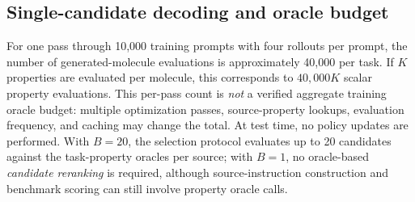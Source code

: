 \begin{table}[t]
\centering\small
\caption{LogSumExp temperature sensitivity on Mistral GDPO, from the author rebuttal.}
\label{tab:tau_sensitivity}
\end{table}

\subsection{Single-candidate decoding and oracle budget}
\label{appendix:oracle_budget}
For one pass through 10,000 training prompts with four rollouts per prompt, the number of generated-molecule evaluations is approximately 40,000 per task. If $K$ properties are evaluated per molecule, this corresponds to $40{,}000K$ scalar property evaluations. This per-pass count is \emph{not} a verified aggregate training oracle budget: multiple optimization passes, source-property lookups, evaluation frequency, and caching may change the total. At test time, no policy updates are performed. With $B=20$, the selection protocol evaluates up to 20 candidates against the task-property oracles per source; with $B=1$, no oracle-based \emph{candidate reranking} is required, although source-instruction construction and benchmark scoring can still involve property oracle calls.

\begin{table}[t]
\centering\small
\caption{Mistral greedy decoding with $B=1$, without multi-candidate reranking. Values from the rebuttal.}
\label{tab:single_candidate}
\end{table}

